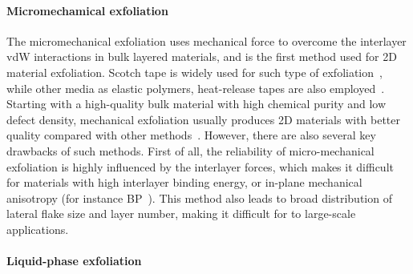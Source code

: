 \paragraph{Micro\-mechamical exfoliation}

The micro\-mechanical exfoliation uses mechanical force to overcome the
interlayer vdW interactions in bulk layered materials, and is the
first method used for 2D material exfoliation. Scotch tape is widely
used for such type of exfoliation~\autocite{Novoselov_2004_gr}, while
other media as elastic polymers, heat-release tapes are also
employed~\autocite{Favron_2015_BP_PDMS,Jain_2018_PDMS}. Starting with a high-quality bulk material with high chemical purity
and low defect density, mechanical exfoliation usually produces
2D materials with better quality compared with other
methods~\autocite{Lin_2019_gr_rev_growth}.
%
However, there are also several key drawbacks of such methods. First
of all, the reliability of micro-mechanical exfoliation is highly
influenced by the interlayer forces, which makes it difficult for materials with high interlayer binding energy, or in-plane
mechanical anisotropy (for instance
BP~\autocite{Favron_2015_BP_PDMS,Liu_2017_aniso_BP}). This method also
leads to broad distribution of lateral flake size and layer number, making it
difficult for to large-scale applications.

\paragraph{Liquid-phase exfoliation}

